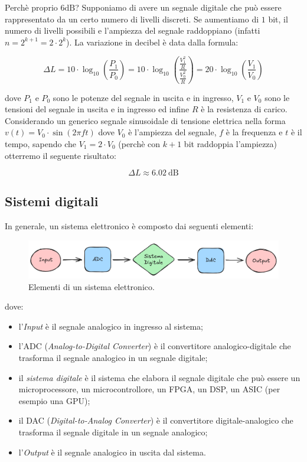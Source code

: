 \documentclass[a4paper,12pt]{report}  %
\begin{document}
Perchè proprio $6 \text{dB}$? Supponiamo di avere un segnale digitale che può essere rappresentato da un certo numero di livelli discreti.
Se aumentiamo di $1$ bit, il numero di livelli possibili e l'ampiezza del segnale raddoppiano (infatti $n = 2^{k + 1} = 2 \cdot 2^k$).
La variazione in decibel è data dalla formula:

\begin{equation}
    \Delta L = 10 \cdot \log_{10} \left( \frac{P_1}{P_0} \right) = 10 \cdot \log_{10} \left( \frac{\frac{V_1^2}{R}}{\frac{V_0^2}{R}} \right) = 20 \cdot \log_{10} \left( \frac{V_1}{V_0} \right) \nonumber
\end{equation}

dove $P_1$ e $P_0$ sono le potenze del segnale in uscita e in ingresso, $V_1$ e $V_0$ sono le tensioni del segnale in uscita e in ingresso ed infine $R$ è la resistenza di carico.
Considerando un generico segnale sinusoidale di tensione elettrica nella forma $v(t) = V_0 \cdot \sin(2 \pi f t)$ dove $V_0$ è l'ampiezza del segnale, $f$ è la frequenza e $t$ è il tempo, sapendo che $V_1 = 2 \cdot V_0$ (perchè con $k + 1$ bit raddoppia l'ampiezza) otterremo il seguente risultato:

\begin{equation}
\Delta L \approx 6.02 \ \text{dB} \nonumber
\end{equation}

\subsection{Sistemi digitali}
In generale, un sistema elettronico è composto dai seguenti elementi:

\begin{figure}[h]
    \centering
    \includegraphics[width=1.0\textwidth]{imgs/electronics-system-elements.png}
    \caption{Elementi di un sistema elettronico.}
    \label{fig:system}
\end{figure}

dove:

\begin{itemize}
    \item l'\textit{Input} è il segnale analogico in ingresso al sistema;
    \item l'ADC (\textit{Analog-to-Digital Converter}) è il convertitore analogico-digitale che trasforma il segnale analogico in un segnale digitale;
    \item il \textit{sistema digitale} è il sistema che elabora il segnale digitale che può essere un microprocessore, un microcontrollore, un FPGA, un DSP, un ASIC (per esempio una GPU);
    \item il DAC (\textit{Digital-to-Analog Converter}) è il convertitore digitale-analogico che trasforma il segnale digitale in un segnale analogico;
    \item l'\textit{Output} è il segnale analogico in uscita dal sistema.
\end{itemize}
\end{document}
